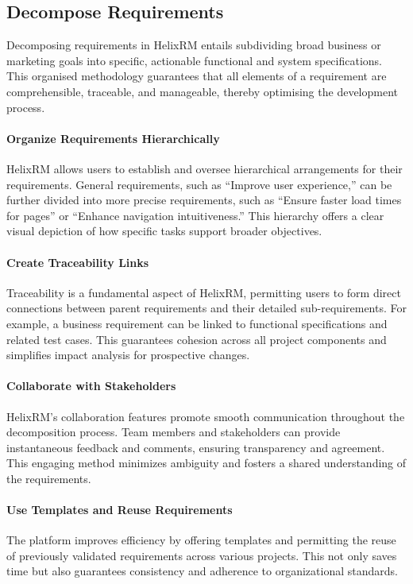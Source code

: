 \subsection{Decompose Requirements}\label{subsec:decompose-requirements}

Decomposing requirements in HelixRM entails subdividing
broad business or marketing goals into specific, actionable
functional and system specifications.
This organised methodology guarantees that all elements of a
requirement are comprehensible, traceable, and manageable,
thereby optimising the development process.

\paragraph{Organize Requirements Hierarchically}
HelixRM allows users to establish and oversee hierarchical
arrangements for their requirements.
General requirements, such as “Improve user experience,” can
be further divided into more precise requirements, such as
“Ensure faster load times for pages” or “Enhance navigation intuitiveness.”
This hierarchy offers a clear visual depiction of how specific tasks
support broader objectives.

\paragraph{Create Traceability Links}
Traceability is a fundamental aspect of HelixRM, permitting
users to form direct connections between parent requirements
and their detailed sub-requirements.
For example, a business requirement can be linked to functional
specifications and related test cases.
This guarantees cohesion across all project components and
simplifies impact analysis for prospective changes.

\paragraph{Collaborate with Stakeholders}
HelixRM’s collaboration features promote smooth communication
throughout the decomposition process.
Team members and stakeholders can provide instantaneous feedback
and comments, ensuring transparency and agreement.
This engaging method minimizes ambiguity and fosters a
shared understanding of the requirements.

\paragraph{Use Templates and Reuse Requirements}
The platform improves efficiency by offering templates
and permitting the reuse of previously validated
requirements across various projects.
This not only saves time but also guarantees consistency
and adherence to organizational standards.


